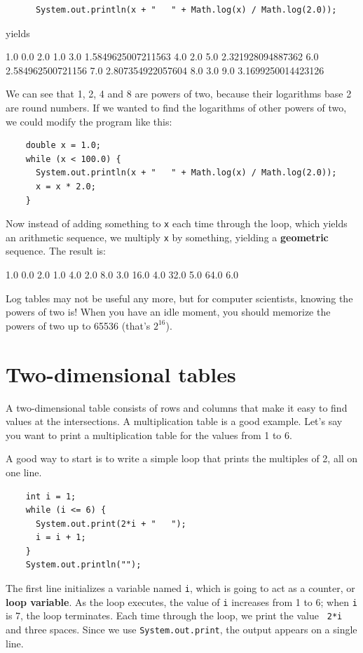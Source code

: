 \documentclass[12pt]{book}
\theoremstyle{exercise}
\begin{document}
\begin{lstlisting}
      System.out.println(x + "   " + Math.log(x) / Math.log(2.0));
\end{lstlisting}
%
yields

\begin{verbatimtab}
1.0   0.0
2.0   1.0
3.0   1.5849625007211563
4.0   2.0
5.0   2.321928094887362
6.0   2.584962500721156
7.0   2.807354922057604
8.0   3.0
9.0   3.1699250014423126
\end{verbatimtab}
%
We can see that 1, 2, 4 and 8 are powers of two, because
their logarithms base 2 are round numbers.  If we wanted to find
the logarithms of other powers of two, we could modify the
program like this:

\begin{lstlisting}
    double x = 1.0;
    while (x < 100.0) {
      System.out.println(x + "   " + Math.log(x) / Math.log(2.0));
      x = x * 2.0;
    }
\end{lstlisting}
%
Now instead of adding something to {\tt x} each time through
the loop, which yields an arithmetic sequence, we multiply
{\tt x} by something, yielding a {\bf geometric} sequence.
The result is:

\begin{verbatimtab}
1.0   0.0
2.0   1.0
4.0   2.0
8.0   3.0
16.0   4.0
32.0   5.0
64.0   6.0
\end{verbatimtab}
%
Log tables may not be useful any more, but for computer scientists,
knowing the powers of two is!  When you have an idle
moment, you should memorize the powers of two up to 65536
(that's $2^{16}$).


\section{Two-dimensional tables}

A two-dimensional table consists of rows and columns that make
it easy to find values at the intersections.  A multiplication
table is a good example.  Let's say you want to print a
multiplication table for the values from 1 to 6.

A good way to start is to write a simple loop that prints
the multiples of 2, all on one line.

\begin{lstlisting}
    int i = 1;
    while (i <= 6) {
      System.out.print(2*i + "   ");
      i = i + 1;
    }
    System.out.println("");
\end{lstlisting}
%
The first line initializes a variable named {\tt i}, which is going
to act as a counter, or {\bf loop variable}.  As the loop executes,
the value of {\tt i} increases from 1 to 6; when {\tt i} is 7, the
loop terminates.  Each time through the loop, we print the value {\tt
  2*i} and three spaces.  Since we use {\tt System.out.print},
the output appears on a single line.
\end{document}
